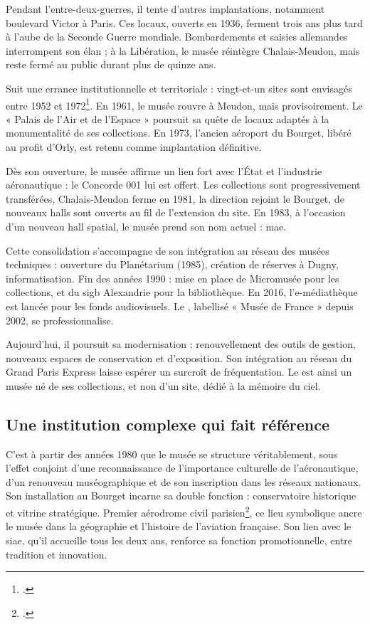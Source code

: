 Pendant l’entre-deux-guerres, il tente d’autres implantations, notamment boulevard Victor à Paris. Ces locaux, ouverts en 1936, ferment trois ans plus tard à l’aube de la Seconde Guerre mondiale. Bombardements et saisies allemandes interrompent son élan ; à la Libération, le musée réintègre Chalais-Meudon, mais reste fermé au public durant plus de quinze ans.

Suit une errance institutionnelle et territoriale : vingt-et-un sites sont envisagés entre 1952 et 1972\footcite{terrierAeroportParisBourget2019}. En 1961, le musée rouvre à Meudon, mais provisoirement. Le « Palais de l’Air et de l’Espace » poursuit sa quête de locaux adaptés à la monumentalité de ses collections. En 1973, l’ancien aéroport du Bourget, libéré au profit d’Orly, est retenu comme implantation définitive.

Dès son ouverture, le musée affirme un lien fort avec l’État et l’industrie aéronautique : le Concorde 001 lui est offert. Les collections sont progressivement transférées, Chalais-Meudon ferme en 1981, la direction rejoint le Bourget, de nouveaux halls sont ouverts au fil de l’extension du site. En 1983, à l’occasion d’un nouveau hall spatial, le musée prend son nom actuel : \acf{mae}.

Cette consolidation s’accompagne de son intégration au réseau des musées techniques : ouverture du Planétarium (1985), création de réserves à Dugny, informatisation. Fin des années 1990 : mise en place de Micromusée pour les collections, et du \ac{sigb} Alexandrie pour la bibliothèque. En 2016, l’e-médiathèque est lancée pour les fonds audiovisuels. Le \mae, labellisé « Musée de France » depuis 2002, se professionnalise.

Aujourd’hui, il poursuit sa modernisation : renouvellement des outils de gestion, nouveaux espaces de conservation et d’exposition. Son intégration au réseau du Grand Paris Express laisse espérer un surcroît de fréquentation. Le \mae est ainsi un musée né de ses collections, et non d’un site, dédié à la mémoire du ciel.

\subsection{Une institution complexe qui fait référence}

C’est à partir des années 1980 que le musée se structure véritablement, sous l’effet conjoint d’une reconnaissance de l’importance culturelle de l’aéronautique, d’un renouveau muséographique et de son inscription dans les réseaux nationaux. Son installation au Bourget incarne sa double fonction : conservatoire historique et vitrine stratégique. Premier aérodrome civil parisien\footcite{terrierAeroportParisBourget2019}, ce lieu symbolique ancre le musée dans la géographie et l’histoire de l’aviation française. Son lien avec le \ac{siae}, qu’il accueille tous les deux ans, renforce sa fonction promotionnelle, entre tradition et innovation.

